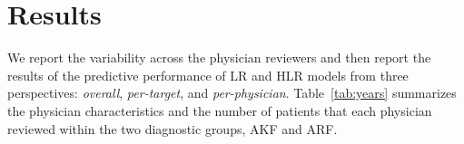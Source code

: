 \section{Results} \label{sec:results}
We report the variability across the physician reviewers and then report the results of the predictive performance of LR and HLR models from three perspectives: \textit{overall}, \textit{per-target}, and \textit{per-physician}. Table~\ref{tab:years} summarizes the physician characteristics and the number of patients that each physician reviewed within the two diagnostic groups, AKF and ARF.

\begin{table}[htbp]
\setlength{\aboverulesep}{0.pt}
\setlength{\belowrulesep}{0.pt}
\renewcommand{\arraystretch}{1.2}
    \caption{Years of ICU experience for each physician and the number of patient cases each physician reviewed. }
    \label{tab:years}
        \vspace{3mm}
    \centering
\end{table}

